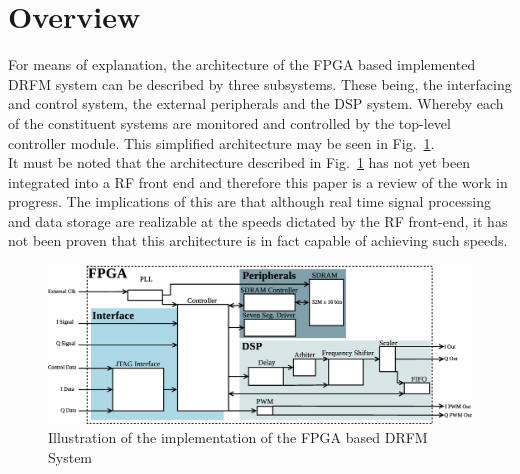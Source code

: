 \section{Overview} \label{sec:design}
	\noindent For means of explanation, the architecture of the FPGA based implemented DRFM system can be described by three subsystems. These being, the interfacing and control system, the external peripherals and the DSP system. Whereby each of the constituent systems are monitored and controlled by the top-level controller module. This simplified architecture may be seen in Fig.~\ref{fig:DRFM_Architecture}.\\ \newline It must be noted that the architecture described in Fig.~\ref{fig:DRFM_Architecture} has not yet been integrated into a RF front end and therefore this paper is a review of the work in progress. The implications of this are that although real time signal processing and data storage are realizable at the speeds dictated by the RF front-end, it has not been proven that this architecture is in fact capable of achieving such speeds.
	\begin{figure}[h!]
		\centering
		\includegraphics[width=0.95\linewidth]{img/System_Overview}
		\caption{Illustration of the implementation of the  FPGA based DRFM System}
		\label{fig:DRFM_Architecture}
	\end{figure}
	
